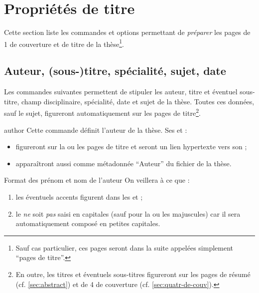\section{Propriétés de titre}
\label{sec:proprietes-de-titre}

Cette section liste les commandes et options permettant de \emph{préparer} les
pages de 1\iere{} de couverture et de titre de la thèse\footnote{Sauf cas
  particulier, ces pages seront dans la suite appelées simplement
  \enquote{pages de titre}.}.

\subsection{Auteur, (sous-)titre, spécialité, sujet,
  date}\label{sec:caracteristiques}

Les commandes suivantes permettent de stipuler les auteur, titre et éventuel
sous-titre, champ disciplinaire, spécialité, date et sujet de la thèse. Toutes
ces données, sauf le sujet, figureront automatiquement sur les pages de
titre\footnote{En outre, les titres et éventuels sous-titres figureront sur les
  pages de résumé (cf. \vref{sec:abstract}) et de 4\ieme{} de couverture (cf.
  \vref{sec:quatr-de-couv}).}.
%
\begin{docCommand}[doc description=\mandatory]{author}{}
  Cette commande définit l'auteur de la thèse. Ses
   et  :
  \begin{itemize}
  \item figureront sur la ou les pages de titre et seront un lien
    hypertexte vers son ;
  \item apparaîtront aussi comme métadonnée \enquote{Auteur} du
    fichier \pdf de la thèse.
  \end{itemize}
  \begin{dbwarning}{Format des prénom et nom de l'auteur}{}
    On veillera à ce que :
    \begin{enumerate}
    \item les éventuels accents figurent dans les  et
      ;
    \item le  \emph{ne} soit \emph{pas} saisi en capitales
      (sauf pour la ou les majuscules) car il sera automatiquement
      composé en petites capitales.
    \end{enumerate}
  \end{dbwarning}
\end{docCommand}
%
